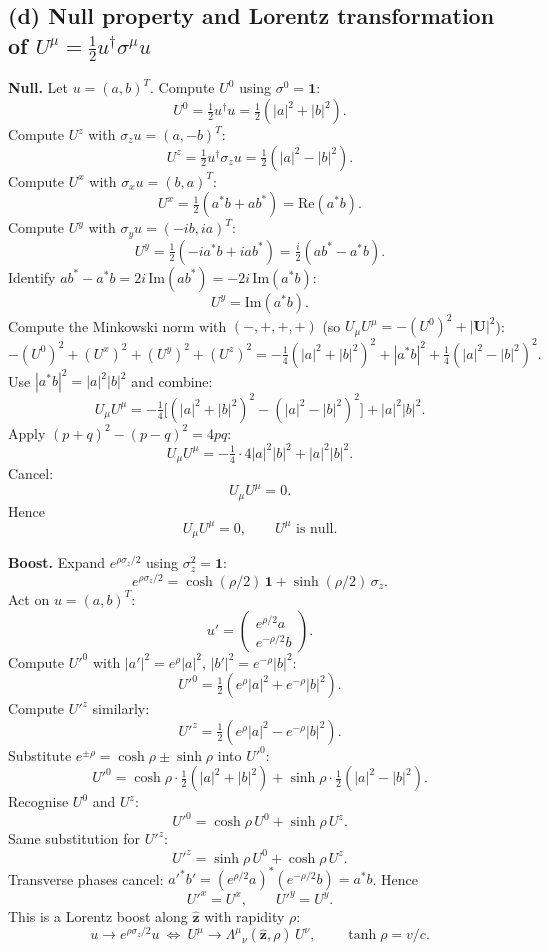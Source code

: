 \documentclass[11pt]{article}
\begin{document}
\subsection*{(d) Null property and Lorentz transformation of $U^\mu=\tfrac12 u^\dagger\sigma^\mu u$}

\textbf{Null.} Let $u=(a,b)^T$. Compute $U^0$ using $\sigma^0 = \bm 1$:
\[ U^0 = \tfrac12 u^\dagger u = \tfrac12(|a|^2+|b|^2). \]
Compute $U^z$ with $\sigma_z u = (a,-b)^T$:
\[ U^z = \tfrac12 u^\dagger\sigma_z u = \tfrac12(|a|^2-|b|^2). \]
Compute $U^x$ with $\sigma_x u = (b,a)^T$:
\[ U^x = \tfrac12(a^*b+ab^*) = \mathrm{Re}(a^*b). \]
Compute $U^y$ with $\sigma_y u = (-ib,ia)^T$:
\[ U^y = \tfrac12(-ia^*b + iab^*) = \tfrac{i}{2}(ab^*-a^*b). \]
Identify $ab^* - a^*b = 2i\,\mathrm{Im}(ab^*) = -2i\,\mathrm{Im}(a^*b)$:
\[ U^y = \mathrm{Im}(a^*b). \]
Compute the Minkowski norm with $(-,+,+,+)$ (so $U_\mu U^\mu = -(U^0)^2 + |\bm U|^2$):
\[ -(U^0)^2 + (U^x)^2 + (U^y)^2 + (U^z)^2 = -\tfrac14(|a|^2+|b|^2)^2 + |a^*b|^2 + \tfrac14(|a|^2-|b|^2)^2. \]
Use $|a^*b|^2 = |a|^2|b|^2$ and combine:
\[ U_\mu U^\mu = -\tfrac14\bigl[(|a|^2+|b|^2)^2 - (|a|^2-|b|^2)^2\bigr] + |a|^2|b|^2. \]
Apply $(p+q)^2-(p-q)^2 = 4pq$:
\[ U_\mu U^\mu = -\tfrac14\cdot 4|a|^2|b|^2 + |a|^2|b|^2. \]
Cancel:
\[ U_\mu U^\mu = 0. \]
Hence
\begin{equation}
\boxed{U_\mu U^\mu = 0,\qquad U^\mu\text{ is null.}}
\end{equation}

\textbf{Boost.} Expand $e^{\rho\sigma_z/2}$ using $\sigma_z^2 = \bm 1$:
\[ e^{\rho\sigma_z/2} = \cosh(\rho/2)\,\bm 1 + \sinh(\rho/2)\,\sigma_z. \]
Act on $u=(a,b)^T$:
\[ u' = \begin{pmatrix}e^{\rho/2}a\\ e^{-\rho/2}b\end{pmatrix}. \]
Compute $U'^0$ with $|a'|^2 = e^\rho|a|^2$, $|b'|^2 = e^{-\rho}|b|^2$:
\[ U'^0 = \tfrac12(e^{\rho}|a|^2 + e^{-\rho}|b|^2). \]
Compute $U'^z$ similarly:
\[ U'^z = \tfrac12(e^{\rho}|a|^2 - e^{-\rho}|b|^2). \]
Substitute $e^{\pm\rho}=\cosh\rho\pm\sinh\rho$ into $U'^0$:
\[ U'^0 = \cosh\rho\cdot\tfrac12(|a|^2+|b|^2) + \sinh\rho\cdot\tfrac12(|a|^2-|b|^2). \]
Recognise $U^0$ and $U^z$:
\[ U'^0 = \cosh\rho\,U^0 + \sinh\rho\,U^z. \]
Same substitution for $U'^z$:
\[ U'^z = \sinh\rho\,U^0 + \cosh\rho\,U^z. \]
Transverse phases cancel: $a'^*b' = (e^{\rho/2}a)^*(e^{-\rho/2}b) = a^*b$. Hence
\[ U'^x = U^x,\qquad U'^y = U^y. \]
This is a Lorentz boost along $\hat{\bm z}$ with rapidity $\rho$:
\begin{equation}
\boxed{u\to e^{\rho\sigma_z/2}u\ \Longleftrightarrow\ U^\mu\to\Lambda^\mu{}_\nu(\hat{\bm z},\rho)\,U^\nu,\qquad\tanh\rho=v/c.}
\end{equation}
\end{document}
